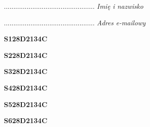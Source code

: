 \begin{turn}{90}\begin{minipage}{\linewidth} \vspace{20mm} ................................................  \textit{Imię i nazwisko}\end{minipage}\end{turn}

\begin{turn}{90}\begin{minipage}{\linewidth} \vspace{20mm} ................................................  \textit{Adres e-mailowy}\end{minipage}\end{turn}

\begin{turn}{90}\huge \begin{minipage}{\linewidth} \vspace{10mm}\textbf{S128D2134C}\end{minipage}\end{turn}

\begin{turn}{90}\huge \begin{minipage}{\linewidth} \vspace{10mm}\textbf{S228D2134C}\end{minipage}\end{turn}

\begin{turn}{90}\huge \begin{minipage}{\linewidth} \vspace{10mm}\textbf{S328D2134C}\end{minipage}\end{turn}

\begin{turn}{90}\huge \begin{minipage}{\linewidth} \vspace{10mm}\textbf{S428D2134C}\end{minipage}\end{turn}

\begin{turn}{90}\huge \begin{minipage}{\linewidth} \vspace{10mm}\textbf{S528D2134C}\end{minipage}\end{turn}

\begin{turn}{90}\huge \begin{minipage}{\linewidth} \vspace{10mm}\textbf{S628D2134C}\end{minipage}\end{turn}

